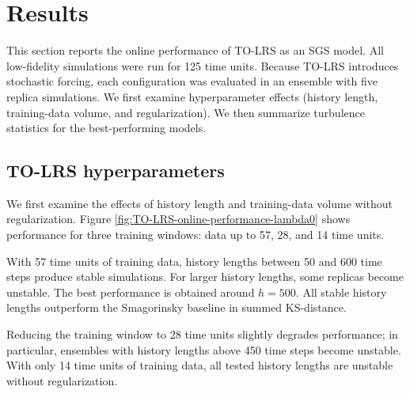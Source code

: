 \documentclass[]{elsarticle}
\begin{document}
\section{Results}\label{sec:results}
This section reports the online performance of TO-LRS as an SGS model. All low-fidelity simulations were run for 125 time units. Because TO-LRS introduces stochastic forcing, each configuration was evaluated in an ensemble with five replica simulations. We first examine hyperparameter effects (history length, training-data volume, and regularization). We then summarize turbulence statistics for the best-performing models.

\subsection{TO-LRS hyperparameters}
We first examine the effects of history length and training-data volume without regularization. Figure \ref{fig:TO-LRS-online-performance-lambda0} shows performance for three training windows: data up to 57, 28, and 14 time units.

With 57 time units of training data, history lengths between 50 and 600 time steps produce stable simulations. For larger history lengths, some replicas become unstable. The best performance is obtained around $h=500$. All stable history lengths outperform the Smagorinsky baseline in summed KS-distance.

Reducing the training window to 28 time units slightly degrades performance; in particular, ensembles with history lengths above 450 time steps become unstable. With only 14 time units of training data, all tested history lengths are unstable without regularization.
\end{document}
